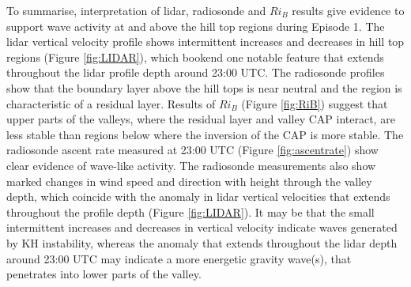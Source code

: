 \documentclass[times]{qjrms4}
\begin{document}
To summarise, interpretation of lidar, radiosonde and $Ri_B$ results give evidence to support wave activity at and above the hill top regions during Episode 1. The lidar vertical velocity profile shows intermittent increases and decreases in hill top regions (Figure \ref{fig:LIDAR}), which bookend one notable feature that extends throughout the lidar profile depth around 23:00 UTC. The radiosonde profiles show that the boundary layer above the hill tops is near neutral and the region is characteristic of a residual layer. Results of $Ri_B$ (Figure \ref{fig:RiB}) suggest that upper parts of the valleys, where the residual layer and valley CAP interact, are less stable than regions below where the inversion of the CAP is more stable. The radiosonde ascent rate measured at 23:00 UTC (Figure \ref{fig:ascentrate}) show clear evidence of wave-like activity. The radiosonde measurements also show marked changes in wind speed and direction with height through the valley depth, which coincide with the anomaly in lidar vertical velocities that extends throughout the profile depth (Figure \ref{fig:LIDAR}). It may be that the small intermittent increases and decreases in vertical velocity indicate waves generated by KH instability, whereas the anomaly that extends throughout the lidar depth around 23:00 UTC may indicate a more energetic gravity wave(s), that penetrates into lower parts of the valley.
%
%
\end{document}
